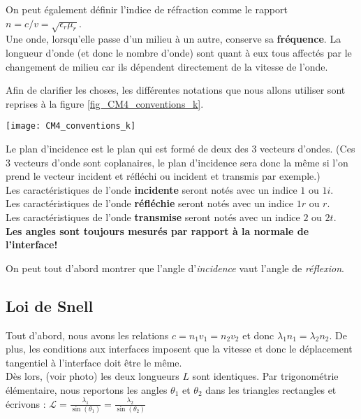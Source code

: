 On peut également définir l'indice de réfraction comme le rapport $n = c/v = \sqrt{\epsilon_{r}\mu_r}$.  \\

Une onde, lorsqu'elle passe d'un milieu à un autre, conserve sa \textbf{fréquence}. La longueur d'onde (et donc le nombre d'onde) sont quant à eux tous affectés 
par le changement de milieu car ils dépendent directement de la vitesse de l'onde.


Afin de clarifier les choses, les différentes notations que nous allons utiliser sont reprises à la figure \ref{fig_CM4_conventions_k}.
\begin{marginfigure}
\texttt{[image: CM4\_conventions\_k]}
\caption{Le plan d'incidence est le plan qui est formé de deux des 3 vecteurs d'ondes. (Ces 3 vecteurs d'onde sont coplanaires, le plan d'incidence sera donc la même si l'on prend le vecteur incident et réfléchi ou incident et transmis par exemple.)\\
Les caractéristiques de l'onde \textbf{incidente} seront notés avec un indice $1$ ou $1i$.\\
Les caractéristiques de l'onde \textbf{réfléchie} seront notés avec un indice $1r$ ou $r$. \\
Les caractéristiques de l'onde \textbf{transmise} seront notés avec un indice $2$ ou $2t$. \\
\textbf{Les angles sont toujours mesurés par rapport à la normale de l'interface!}}
\label{fig_CM4_conventions_k}
\end{marginfigure}

On peut tout d'abord montrer que l'angle d'\textit{incidence} vaut l'angle de \textit{réflexion}. 

\subsection{Loi de Snell}

Tout d'abord, nous avons les relations  $c = n_{1} v_{1} = n_{2} v_{2}$ et donc $\lambda_{1} n_{1}= \lambda_{2} n_{2}$.
De plus, les conditions aux interfaces imposent que la vitesse et donc le déplacement tangentiel à l'interface doit être le même. \\
Dès lors, (voir photo) les deux longueurs $L$ sont identiques. Par trigonométrie élémentaire, nous reportons les angles $\theta_{1}$ et $\theta_{2}$ 
dans les triangles rectangles et écrivons : $\mathcal{L} = \frac{\lambda_{1}}{\sin(\theta_{1})} = \frac{\lambda_{2}}{\sin(\theta_{2})}$


